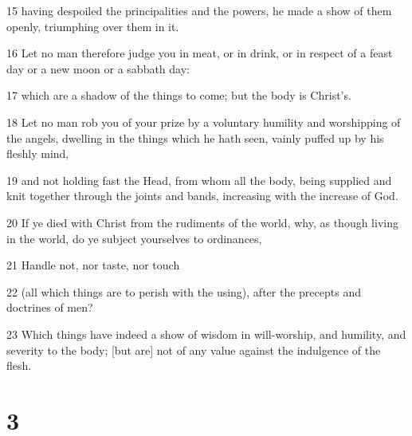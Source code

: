\par 15 having despoiled the principalities and the powers, he made a show of them openly, triumphing over them in it.
\par 16 Let no man therefore judge you in meat, or in drink, or in respect of a feast day or a new moon or a sabbath day:
\par 17 which are a shadow of the things to come; but the body is Christ's.
\par 18 Let no man rob you of your prize by a voluntary humility and worshipping of the angels, dwelling in the things which he hath seen, vainly puffed up by his fleshly mind,
\par 19 and not holding fast the Head, from whom all the body, being supplied and knit together through the joints and bands, increasing with the increase of God.
\par 20 If ye died with Christ from the rudiments of the world, why, as though living in the world, do ye subject yourselves to ordinances,
\par 21 Handle not, nor taste, nor touch
\par 22 (all which things are to perish with the using), after the precepts and doctrines of men?
\par 23 Which things have indeed a show of wisdom in will-worship, and humility, and severity to the body; [but are] not of any value against the indulgence of the flesh.

\chapter{3}

